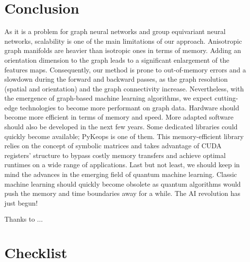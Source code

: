 \documentclass{article}
\begin{document}
\section{Conclusion} \label{sec:conclusion}

As it is a problem for graph neural networks and group equivariant neural networks, scalability is one of the main limitations of our approach. Anisotropic graph manifolds are heavier than isotropic ones in terms of memory. Adding an orientation dimension to the graph leads to a significant enlargement of the features maps. Consequently, our method is prone to out-of-memory errors and a slowdown during the forward and backward passes, as the graph resolution (spatial and orientation) and the graph connectivity increase. Nevertheless, with the emergence of graph-based machine learning algorithms, we expect cutting-edge technologies to become more performant on graph data. Hardware should become more efficient in terms of memory and speed. More adapted software should also be developed in the next few years. Some dedicated libraries could quickly become available; PyKeops \citep{charlier2020kernel} is one of them. This memory-efficient library relies on the concept of symbolic matrices and takes advantage of CUDA registers' structure to bypass costly memory transfers and achieve optimal runtimes on a wide range of applications. Last but not least, we should keep in mind the advances in the emerging field of quantum machine learning. Classic machine learning should quickly become obsolete as quantum algorithms would push the memory and time boundaries away for a while. The AI revolution has just begun!


\begin{ack}
Thanks to ...
\end{ack}

\clearpage



\clearpage
\section*{Checklist}
\end{document}
